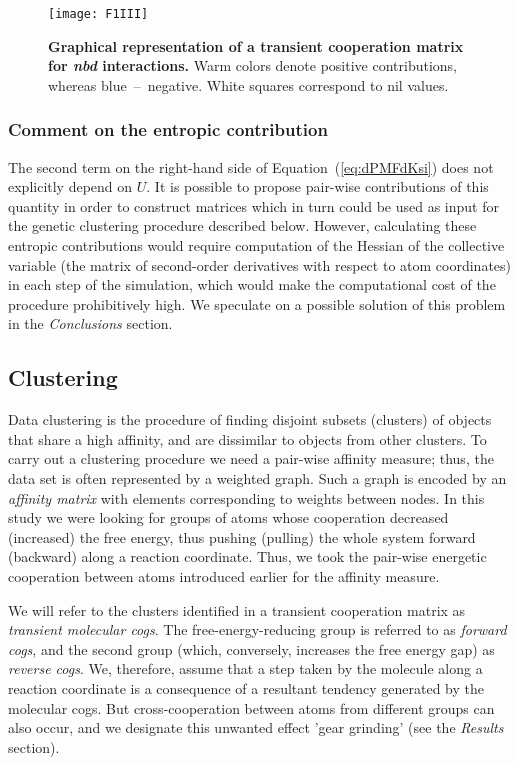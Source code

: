 \documentclass[a4paper,11pt,twoside]{book}%
\begin{document}
\begin{figure}[h!]
\centering
\texttt{[image: F1III]}
\caption{
{\bf Graphical representation of a transient cooperation matrix for \emph{nbd} interactions.}
Warm colors denote positive contributions, whereas blue~--~negative.
White squares correspond to {\color{black}nil values}.
}
\label{fig:numberedMatrix}
\end{figure}

\subsubsection{Comment on the entropic contribution} 
The second term on the right-hand side of Equation~(\ref{eq:dPMFdKsi}) does not explicitly depend on $U$.
It is possible to propose pair-wise contributions of this quantity in order to construct matrices which in turn could be used as input for the genetic clustering procedure described below.
{\color{black}However, calculating these entropic contributions would require computation of the Hessian of the collective variable (the matrix of second-order derivatives with respect to atom coordinates) in each step of the simulation, which would make the computational cost of the procedure prohibitively high.}
{\color{black}We speculate on a possible solution of this problem in the \emph{Conclusions} section.}

\subsection{Clustering}
Data clustering is the procedure of finding disjoint subsets (clusters) of objects that share a high affinity, and are dissimilar to objects from other clusters.
To carry out a clustering procedure we need a pair-wise affinity measure; thus, the data set is often represented by a weighted graph.
Such {\color{black}a} graph is encoded by an \emph{affinity matrix} with elements corresponding to weights between nodes.
In this study we were looking for groups of atoms whose cooperation decreased (increased) the free energy, thus pushing (pulling) the whole system forward (backward) along a reaction coordinate.
Thus, we took the pair-wise energetic cooperation between atoms introduced earlier for the affinity measure. 

We will refer to the clusters identified in a transient cooperation matrix as \emph{transient molecular cogs}.
The free-energy-reducing group is referred to as \emph{forward cogs}, and the second group (which, conversely, increases the free energy gap) as \emph{reverse cogs}.
We, therefore, assume that a step taken by the molecule along a reaction coordinate is a consequence of a resultant tendency generated by the molecular cogs.
But cross-cooperation between atoms from different groups can also occur, and we {\color{black}designate} this unwanted effect 'gear grinding' (see the \emph{Results} section).
\end{document}
